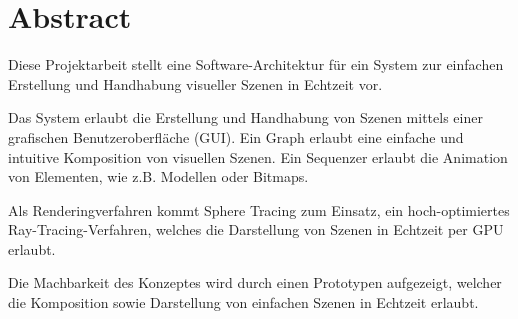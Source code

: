 
\chapter*{Abstract}
\label{chap:abstract}

Diese Projektarbeit stellt eine Software-Architektur für ein System zur
einfachen Erstellung und Handhabung visueller Szenen in Echtzeit vor.

Das System erlaubt die Erstellung und Handhabung von Szenen mittels einer
grafischen Benutzeroberfläche (GUI). Ein Graph erlaubt eine einfache und
intuitive Komposition von visuellen Szenen. Ein Sequenzer erlaubt die Animation
von Elementen, wie z.B. Modellen oder Bitmaps.

Als Renderingverfahren kommt Sphere Tracing zum Einsatz, ein hoch-optimiertes
Ray-Tracing-Verfahren, welches die Darstellung von Szenen in Echtzeit per GPU
erlaubt.

Die Machbarkeit des Konzeptes wird durch einen Prototypen aufgezeigt, welcher
die Komposition sowie Darstellung von einfachen Szenen in Echtzeit erlaubt.

